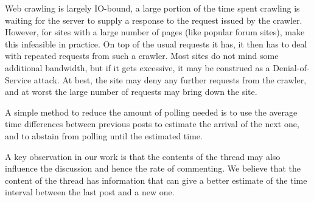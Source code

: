 Web crawling is largely IO-bound, a large portion of the time spent crawling is 
waiting for the server to supply a response to the request issued by the 
crawler. However, for sites with a large number of pages (like popular forum 
sites), make this infeasible in practice. 
On top of the usual requests it has, 
it then has to deal with repeated requests from such a crawler. Most sites do 
not mind some additional bandwidth, but if it gets excessive, it may be 
construed as a Denial-of-Service attack. At best, the site may deny any further 
requests from the crawler, and at worst the large number of requests may bring 
down the site.

A simple method to reduce the amount of polling needed is to use the
average time differences between previous posts to estimate the
arrival of the next one, and to abstain from polling until the
estimated time.

A key observation in our work is that the contents of the thread may
also influence the discussion and hence the rate of commenting.  
We
believe that the content of the thread has information that can give a
better estimate of the time interval between the last post and a new
one.

